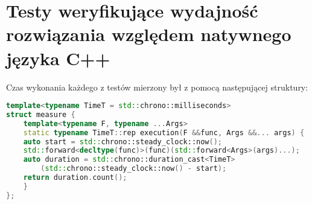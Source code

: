 \documentclass[a4paper,10pt]{report}
\begin{document}
\section{Testy weryfikujące wydajność rozwiązania względem natywnego języka C++}
Czas wykonania każdego z testów mierzony był z pomocą następującej struktury:
\begin{lstlisting}[caption={Pomiar czasu\cite{timer}},label={lst:timer},language=cpp]
template<typename TimeT = std::chrono::milliseconds>
struct measure {
	template<typename F, typename ...Args>
	static typename TimeT::rep execution(F &&func, Args &&... args) {
	auto start = std::chrono::steady_clock::now();
	std::forward<decltype(func)>(func)(std::forward<Args>(args)...);
	auto duration = std::chrono::duration_cast<TimeT>
		(std::chrono::steady_clock::now() - start);
	return duration.count();
	}
};
\end{lstlisting}
\end{document}
